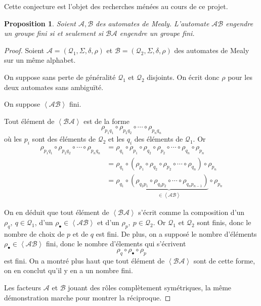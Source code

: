 \documentclass[11pt,a4paper]{article}
\newtheorem{prop}{Proposition}
\begin{document}
Cette conjecture est l'objet des recherches ménées au cours de ce projet.

\begin{prop}
  \label{prop:finitude-c}
  Soient $\mathcal{A}, \mathcal{B}$ des automates de Mealy.
  L'automate $\mathcal{A}\mathcal{B}$ engendre un groupe fini si et seulement si $\mathcal{B}\mathcal{A}$ engendre un groupe fini.
\end{prop}

\begin{proof}
  Soient $\mathcal{A}=\left(\mathcal{Q}_1, \Sigma, \delta, \rho\right)$ et $\mathcal{B}=\left(\mathcal{Q}_2, \Sigma, \delta, \rho\right)$ des automates de Mealy sur un même alphabet.

  On suppose sans perte de généralité $\mathcal{Q}_1$ et $\mathcal{Q}_2$ disjoints. On écrit donc $\rho$ pour les deux automates sans ambiguïté.

  On suppose $\left<\mathcal{A}\mathcal{B}\right>$ fini.

  Tout élément de $\left<\mathcal{B}\mathcal{A}\right>$ est de la forme
  \[
    \rho_{p_1q_1}\circ\rho_{p_2q_2}\circ\cdots\circ\rho_{p_nq_n}
  \]
  où les $p_i$ sont des éléments de $\mathcal{Q}_2$ et les $q_i$ des éléments de $\mathcal{Q}_1$. Or
  \begin{align*}
    \rho_{p_1q_1}\circ\rho_{p_2q_2}\circ\cdots\circ\rho_{p_nq_n} &= \rho_{q_1}\circ\rho_{p_1}\circ\rho_{q_2}\circ\rho_{p_2}\circ\cdots\circ\rho_{q_n}\circ\rho_{p_n} \\
    &=\rho_{q_1}\circ\left(\rho_{p_1}\circ\rho_{q_2}\circ\rho_{p_2}\circ\cdots\circ\rho_{q_n}\right)\circ\rho_{p_n} \\
    &=\rho_{q_1}\circ\underbrace{\left(\rho_{q_2p_1}\circ\rho_{q_3p_2}\circ\cdots\circ\rho_{q_np_{n-1}}\right)}_{\in\left<\mathcal{A}\mathcal{B}\right>}\circ\rho_{p_n}
  \end{align*}

  On en déduit que tout élément de $\left<\mathcal{B}\mathcal{A}\right>$ s'écrit comme la composition d'un $\rho_{q},~q\in\mathcal{Q}_1$, d'un $\rho_\bullet\in\left<\mathcal{A}\mathcal{B}\right>$ et d'un $\rho_{p},~p\in\mathcal{Q}_2$. Or $\mathcal{Q}_1$ et $\mathcal{Q}_2$ sont finis, donc le nombre de choix de $p$ et de $q$ est fini. De plus, on a supposé le nombre d'éléments $\rho_\bullet\in\left<\mathcal{A}\mathcal{B}\right>$ fini, donc le nombre d'élements qui s'écrivent \[ \rho_q\circ\rho_\bullet\circ\rho_p \] est fini. On a montré plus haut que tout élément de $\left<\mathcal{B}\mathcal{A}\right>$ sont de cette forme, on en conclut qu'il y en a un nombre fini.

  Les facteurs $\mathcal{A}$ et $\mathcal{B}$ jouant des rôles complètement symétriques, la même démonstration marche pour montrer la réciproque.
\end{proof}
\end{document}
